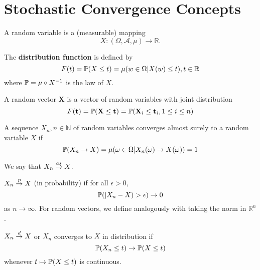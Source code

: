 \chapter{Stochastic Convergence Concepts}
\label{cha:stoch-conv-conc}

\begin{defn}
  A random variable is a (measurable) mapping
  \begin{equation}
    \label{eq:37}
    X: (\Omega, \mathcal{A}, \mu) \rightarrow \mathbb{R}.
  \end{equation}

  The \textbf{distribution function} is defined by
  \begin{equation}
    \label{eq:7}
    F(t) = \Prob{X \leq t} = \mu(w \in \Omega | X(w) \leq t), t \in
    \mathbb{R}
  \end{equation}
  where $\Prob = \mu \circ X^{-1}$ is the law of $X$.

  A random vector $\mathbf{X}$ is a vector of random variables with
  joint distribution
  \begin{equation}
    \label{eq:8}
    F(\mathbf{t}) = \Prob{\mathbf{X} \leq \mathbf{t}} = 
    \Prob{\mathbf{X}_{i} \leq \mathbf{t}_{i}, 1 \leq i \leq n}
  \end{equation}
\end{defn}

\begin{defn}
  A sequence $X_{n}, n \in \mathbb{N}$ of random variables converges
  almost surely to a random variable $X$ if
  \begin{equation}
    \label{eq:4}
    \Prob{X_{n} \rightarrow X} = \mu(\omega \in \Omega | X_{n}(\omega)
    \rightarrow X(\omega)) = 1
  \end{equation}

  We say that $X_{n} \overset{as}{\rightarrow} X$.
\end{defn}

\begin{defn}
  $X_{n} \overset{p}{\rightarrow} X$ (in probability) if for all $\epsilon > 0$,
  \begin{equation}
    \label{eq:5}
    \Prob{|X_{n} - X} > \epsilon) \rightarrow 0
  \end{equation} as $n \rightarrow \infty$.
  For random vectors, we define analogously with taking the norm in
  $\mathbb{R}^{n}$. 
\end{defn}

\begin{defn}
  $X_{n} \overset{d}{\rightarrow} X$ or $X_{n}$ converges to $X$ in distribution if
  \begin{equation}
    \label{eq:6}
    \Prob{X_{n} \leq t} \rightarrow \Prob{X \leq t}
  \end{equation} whenever $t \mapsto \Prob{X \leq t}$ is continuous.
\end{defn}

